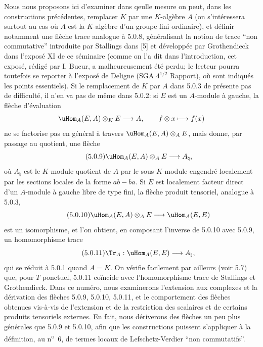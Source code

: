 Nous nous proposons ici d'examiner dans qeulle mesure on peut, dans les constructions précédentes, remplacer $K$ par une $K$-algèbre $A$ (on s'intéressera surtout au cas où $A$ est la $K$-algèbre d'un groupe fini ordinaire), et définir notamment une flèche trace analogue à 5.0.8, généralisant la notion de trace ``non commutative'' introduite par Stallings dans [5] et développée par Grothendieck dans l'exposé XI de ce séminaire (comme on l'a dit dans l'introduction, cet exposé, rédigé par I. Bucur, a malheureusement été perdu; le lecteur pourra toutefois se reporter à l'exposé de Deligne (SGA $4^{1/2}$ Rapport), où sont indiqués les points essentiels). Si le remplacement de $K$ par $A$ dans 5.0.3 de présente pas de difficulté, il n'en va pas de même dans 5.0.2: si $E$ est un $A$-module à gauche, la flèche d'évaluation
\[
\uHom_A(E,A)\otimes_KE\longrightarrow A,
\qquad f\otimes x\longmapsto f(x)
\]
ne se factorise pas en général à travers $\uHom_A(E,A)\otimes_AE$, mais donne, par passage au quotient, une flèche
\begin{equation}\tag{5.0.9}
\uHom_A(E,A)\otimes_AE\longrightarrow A_\natural,
\end{equation}
où $A_\natural$ est le $K$-module quotient de $A$ par le sous-$K$-module engendré localement par les sections locales de la forme $ab-ba$. Si $E$ est localement facteur direct d'un $A$-module à gauche libre de type fini, la flèche produit tensoriel, analogue à 5.0.3,
\begin{equation}\tag{5.0.10}
\uHom_A(E,A)\otimes_AE\longrightarrow\uHom_A(E,E)
\end{equation}
est un isomorphisme, et l'on obtient, en composant l'inverse de 5.0.10 avec 5.0.9, un homomorphisme trace
\begin{equation}\tag{5.0.11}
\Tr_A:\uHom_A(E,E)\longrightarrow A_\natural,
\end{equation}
qui se réduit à 5.0.1 quand $A=K$. On vérifie facilement par ailleurs (voir 5.7) que, pour $T$ ponctuel, 5.0.11 coïncide avec l'homomorphisme trace de Stallings et Grothendieck. Dans ce numéro, nous examinerons l'extension aux complexes et la dérivation des flèches 5.0.9, 5.0.10, 5.0.11, et le comportement des flèches obtenues vis-à-vis de l'extension et de la restriction des scalaires et de certains produits tensoriels externes. En fait, nous dériverons des flèches un peu plus générales que 5.0.9 et 5.0.10, afin que les constructions puissent s'appliquer à la définition, au n\textsuperscript{o}~6, de termes locaux de Lefschetz-Verdier ``non commutatifs''.

